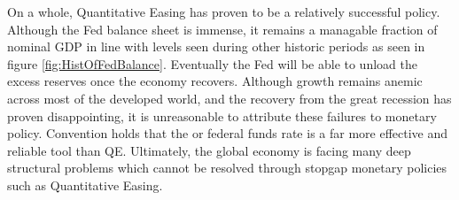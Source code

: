 \documentclass[12pt]{report}
\begin{document}
On a whole, Quantitative Easing has proven to be a relatively successful policy.
Although the Fed balance sheet is immense, it remains a managable fraction of nominal GDP in line with levels seen during other historic periods as seen in figure \ref{fig:HistOfFedBalance}.
Eventually the Fed will be able to unload the excess reserves once the economy recovers.\autocite[4]{ricketts2014rise}
Although growth remains anemic across most of the developed world, and the recovery from the great recession has proven disappointing, it is unreasonable to attribute these failures to monetary policy.
Convention holds that the or federal funds rate is a far more effective and reliable tool than QE.\autocite[465]{blinder2010quantitative}
Ultimately, the global economy is facing many deep structural problems which cannot be resolved through stopgap monetary policies such as Quantitative Easing.


\begin{appendices}


\fig{HistOfFedBalance}{.8}{Fed balance sheet as a share of nominal GDP}{{\autocite[2]{ricketts2014rise}}

\end{appendices}

\nocite{*}
\printbibliography
\end{document}
